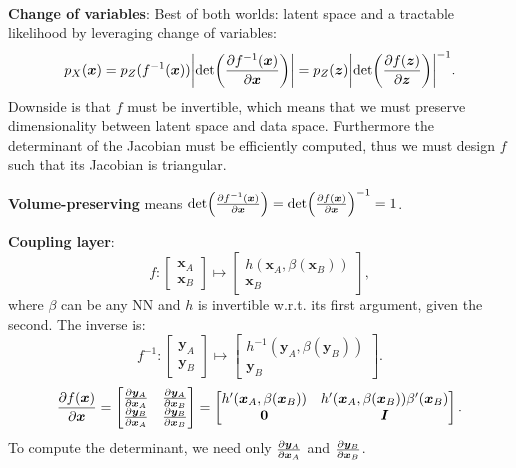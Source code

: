 \documentclass{article}
\newcommand{\lft}{\mathopen{}\mathclose\bgroup\left}
\newcommand{\rgt}{\aftergroup\egroup\right}
\renewcommand{\vec}[1]{\bm{#1}}
\newcommand{\mat}[1]{\bm{#1}}
\newenvironment{topic}[1]
{\textbf{\sffamily \colorbox{black}{\rlap{\textbf{\textcolor{white}{#1}}}\hspace{\linewidth}\hspace{-2\fboxsep}}} \\ \vspace{0.2cm}}
{}
\begin{document}
\begin{multicols*}{2}
\begin{topic}{Normalizing flow}
        \textbf{Change of variables}: Best of both worlds: latent space and a tractable likelihood by
        leveraging change of variables: \[
            p_X(\vec{x}) = p_Z(f^{-1}(\vec{x})) \lft| \det\lft( \pdv{f^{-1}(\vec{x})}{\vec{x}} \rgt) \rgt| = p_Z(\vec{z}) \lft| \det\lft( \pdv{f(\vec{z})}{\vec{z}} \rgt) \rgt|^{-1}.
        \]
        Downside is that $f$ must be invertible, which means that we must preserve dimensionality between
        latent space and data space. Furthermore the determinant of the Jacobian must be efficiently
        computed, thus we must design $f$ such that its Jacobian is triangular.

        \textbf{Volume-preserving} means $\det\lft(\pdv{f^{-1}(\vec{x})}{\vec{x}}\rgt) = \det\lft(\pdv{f(\vec{x})}{\vec{x}}\rgt)^{-1} = 1$.

        \textbf{Coupling layer}: \[
            f: \begin{bmatrix}
                \vec{x}_A \\ \vec{x}_B
            \end{bmatrix}
            \mapsto
            \begin{bmatrix}
                h(\vec{x}_A, \beta(\vec{x}_B)) \\
                \vec{x}_B
            \end{bmatrix},
        \]
        where $\beta$ can be any NN and $h$ is invertible w.r.t. its first argument, given the second. The
        inverse is: \[
            f^{-1}: \begin{bmatrix}
                \vec{y}_A \\
                \vec{y}_B
            \end{bmatrix}
            \mapsto
            \begin{bmatrix}
                h^{-1}(\vec{y}_A, \beta(\vec{y}_B)) \\
                \vec{y}_B
            \end{bmatrix}.
        \]
        \[
            \pdv{f(\vec{x})}{\vec{x}} = \begin{bmatrix}
                \pdv{\vec{y}_A}{\vec{x}_A} & \pdv{\vec{y}_A}{\vec{x}_B} \\
                \pdv{\vec{y}_B}{\vec{x}_A} & \pdv{\vec{y}_B}{\vec{x}_B}
            \end{bmatrix}
            = \begin{bmatrix}
                h'(\vec{x}_A, \beta(\vec{x}_B)) & h'(\vec{x}_A, \beta(\vec{x}_B)) \beta'(\vec{x}_B) \\
                \mat{0}                         & \mat{I}
            \end{bmatrix}.
        \]
        To compute the determinant, we need only $\pdv{\vec{y}_A}{\vec{x}_A}$ and
        $\pdv{\vec{y}_B}{\vec{x}_B}$.


\end{topic}
\end{multicols*}
\end{document}
